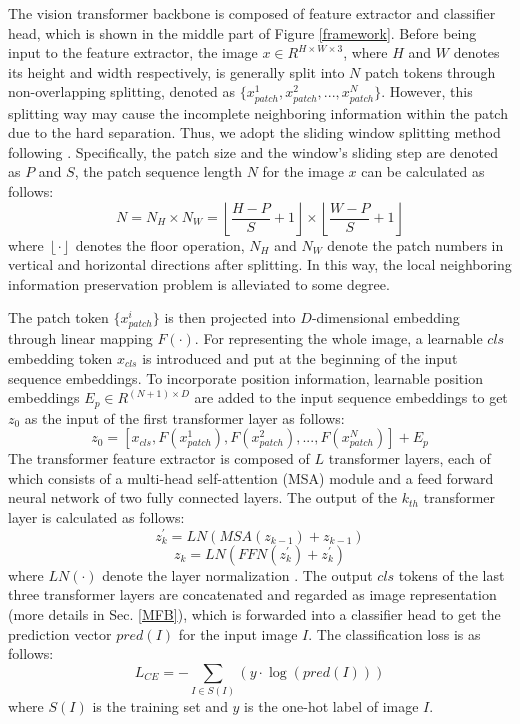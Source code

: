 \documentclass[sigconf, nonacm]{acmart}
\begin{document}
The vision transformer backbone is composed of feature extractor and classifier head, which is shown in the middle part of Figure \ref{framework}. Before being input to the feature extractor, the image $x \in {R^{H \times W \times 3}}$, where $H$ and $W$ denotes its height and width respectively, is generally split into $N$ patch tokens through non-overlapping splitting, denoted as $\{ x_{patch}^1,x_{patch}^2,...,x_{patch}^N\}$. However, this splitting way may cause the incomplete neighboring information within the patch due to the hard separation. Thus, we adopt the sliding window splitting method following \cite{he2021transreid}. Specifically, the patch size and the window’s sliding step are denoted as $P$ and $S$, the patch sequence length $N$ for the image $x$ can be calculated as follows:
\begin{equation}
N = {N_H} \times {N_W} = \left\lfloor {\frac{{H - P}}{S} + 1} \right\rfloor  \times \left\lfloor {\frac{{W - P}}{S} + 1} \right\rfloor
\label{slide}
\end{equation}
where $\left\lfloor  \cdot  \right\rfloor$ denotes the floor operation, ${N_H}$ and ${N_W}$ denote the patch numbers in vertical and horizontal directions after splitting. In this way, the local neighboring information preservation problem is alleviated to some degree. 

The patch token $\{ x_{patch}^i\} $ is then projected into $D$-dimensional embedding through linear mapping $F( \cdot )$. For representing the whole image, a learnable $cls$ embedding token ${x_{cls}}$ is introduced and put at the beginning of the input sequence embeddings. To incorporate position information, learnable position embeddings ${E_p} \in {R^{(N + 1) \times D}}$ are added to the input sequence embeddings to get $z_0$ as the input of the first transformer layer as follows:
\begin{equation}
{z_0} = [{x_{cls}},F(x_{patch}^1),F(x_{patch}^2),...,F(x_{patch}^N)] + {E_p}
\end{equation}
The transformer feature extractor is composed of $L$ transformer layers, each of which consists of a multi-head self-attention (MSA) module and a feed forward neural network of two fully connected layers. The output of the ${k_{th}}$ transformer layer is calculated as follows:
\begin{equation}
z_k^{'} = LN(MSA({z_{k - 1}}) + {z_{k - 1}})
\end{equation}
\begin{equation}
{z_k} = LN(FFN(z_k^{'}) + z_k^{'})
\end{equation}
where $LN( \cdot )$ denote the layer normalization \cite{ba2016layer}. The output $cls$ tokens of the last three transformer layers are concatenated and regarded as image representation (more details in Sec. \ref{MFB}), which is forwarded into a classifier head to get the prediction vector $pred(I)$ for the input image $I$. The classification loss is as follows:
\begin{equation}
{L_{CE}} =  - \sum\limits_{I \in S(I)} {(y \cdot \log (pred(I)))}
\end{equation}
where $S(I)$ is the training set and $y$ is the one-hot label of image $I$.
\end{document}
